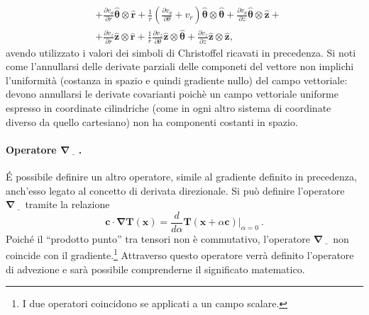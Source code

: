 \begin{example}
\begin{equation}
\begin{aligned}
     & +  \frac{\partial v_\theta}{\partial r}                              \bm{\hat{\theta}} \otimes \bm{\hat{r}}  + 
        \frac{1}{r}\left( \frac{\partial v_\theta}{\partial \theta} +  v_r \right) \bm{\hat{\theta}} \otimes \bm{\hat{\theta}}  + 
        \frac{\partial v_\theta}{\partial z}                                \bm{\hat{\theta}} \otimes \bm{\hat{z}}  + \\
     & + \frac{\partial v_z}{\partial r}                                    \bm{\hat{z}} \otimes \bm{\hat{r}} + 
        \frac{1}{r}\frac{\partial v_z}{\partial \theta}                     \bm{\hat{z}} \otimes \bm{\hat{\theta}}  + 
        \frac{\partial v_z}{\partial z}                                     \bm{\hat{z}} \otimes \bm{\hat{z}}  ,
\end{aligned}
\end{equation}
 avendo utilizzato i valori dei simboli di Christoffel ricavati in precedenza. Si noti come l'annullarsi delle derivate parziali delle componeti del vettore non implichi l'uniformità (costanza in spazio e quindi gradiente nullo) del campo vettoriale: devono annullarsi le derivate covarianti poichè un campo vettoriale uniforme espresso in coordinate cilindriche (come in ogni altro sistema di coordinate diverso da quello cartesiano) non ha componenti costanti in spazio.
\end{example}

\paragraph{Operatore $\bm{\nabla}\underline{\hspace{8pt}}\ $.}
\'E possibile definire un altro operatore, simile al gradiente definito in precedenza, anch'esso legato al concetto di derivata direzionale.
Si può definire l'operatore $\bm{\nabla} \underline{\hspace{8pt}}$ tramite la relazione
\begin{equation}
    \bm{c}  \cdot \bm{\nabla} \bm{T}(\bm{x})
   = \dfrac{d}{d\alpha} \bm{T}(\bm{x}+\alpha \bm{c})\big|_{\alpha=0} \ .
\end{equation}
Poiché il ``prodotto punto'' tra tensori non è commutativo, l'operatore $\bm{\nabla}\underline{\hspace{8pt}}$ non coincide con il gradiente.\footnote{I due operatori coincidono se applicati a un campo scalare.}
Attraverso questo operatore verrà definito l'operatore di advezione e sarà possibile comprenderne il significato matematico.

